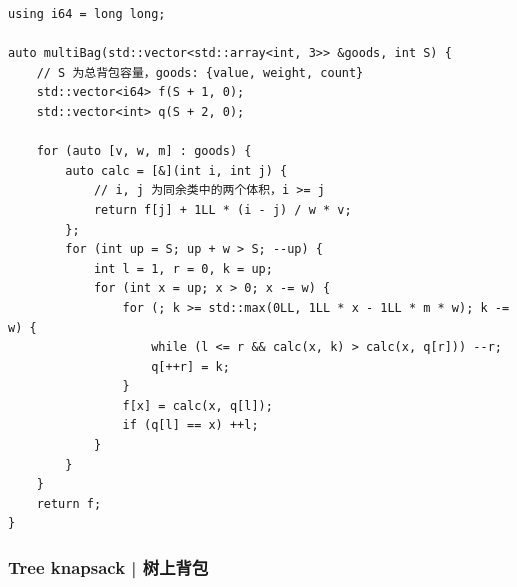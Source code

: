         \begin{lstlisting}
using i64 = long long;

auto multiBag(std::vector<std::array<int, 3>> &goods, int S) {
    // S 为总背包容量，goods: {value, weight, count}
    std::vector<i64> f(S + 1, 0);
    std::vector<int> q(S + 2, 0);

    for (auto [v, w, m] : goods) {
        auto calc = [&](int i, int j) {
            // i, j 为同余类中的两个体积，i >= j
            return f[j] + 1LL * (i - j) / w * v;
        };
        for (int up = S; up + w > S; --up) {
            int l = 1, r = 0, k = up;
            for (int x = up; x > 0; x -= w) {
                for (; k >= std::max(0LL, 1LL * x - 1LL * m * w); k -= w) {
                    while (l <= r && calc(x, k) > calc(x, q[r])) --r;
                    q[++r] = k;
                }
                f[x] = calc(x, q[l]);
                if (q[l] == x) ++l;
            }
        }
    }
    return f;
}
        \end{lstlisting}

    \subsubsection{Tree knapsack | 树上背包}

